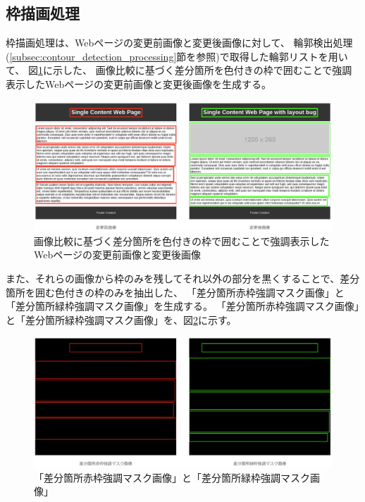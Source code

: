 \subsection{枠描画処理}\label{subsec:Bounding box drawing process}
枠描画処理は、Webページの変更前画像と変更後画像に対して、
輪郭検出処理(\ref{subsec:contour_detection_processing}節を参照)で取得した輪郭リストを用いて、
図\ref{fig: img_diff_highlight}に示した、
画像比較に基づく差分箇所を色付きの枠で囲むことで強調表示したWebページの変更前画像と変更後画像を生成する。
\begin{figure}[tp]
    \begin{center}
        \includegraphics[width=1.0\columnwidth]{image/4_img_diff_highlight.png}
        \caption{画像比較に基づく差分箇所を色付きの枠で囲むことで強調表示したWebページの変更前画像と変更後画像}
        \label{fig: img_diff_highlight}
    \end{center}
\end{figure}
また、それらの画像から枠のみを残してそれ以外の部分を黒くすることで、差分箇所を囲む色付きの枠のみを抽出した、
「差分箇所赤枠強調マスク画像」と「差分箇所緑枠強調マスク画像」を生成する。
「差分箇所赤枠強調マスク画像」と「差分箇所緑枠強調マスク画像」を、図\ref{fig: img_diff_highlight_mask}に示す。
\begin{figure}[tp]
    \begin{center}
        \includegraphics[width=1.0\columnwidth]{image/4_img_diff_highlight_mask.png}
        \caption{「差分箇所赤枠強調マスク画像」と「差分箇所緑枠強調マスク画像」}
        \label{fig: img_diff_highlight_mask}
    \end{center}
\end{figure}
